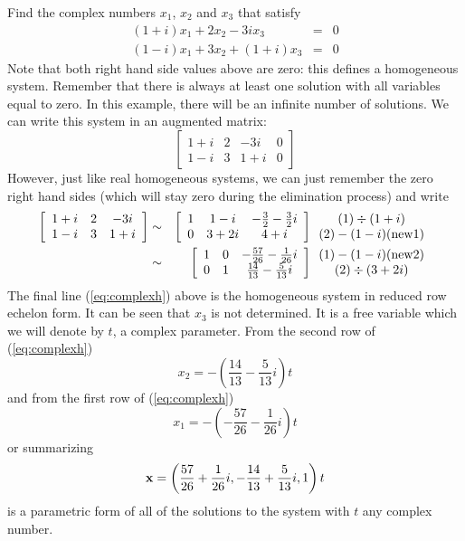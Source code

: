 \begin{example}
Find the complex numbers $x_1$, $x_2$ and $x_3$ that satisfy 
\begin{eqnarray} 
(1+i) x_1 + 2x_2 -3i x_3 & = & 0 \\
(1-i)x_1 +3x_2 + (1+i) x_3 & = & 0 
\end{eqnarray} 
Note that both right hand side values above are zero: this defines a homogeneous system. Remember that there is always at least one solution with all variables equal to zero. In this example, there will be an infinite number of solutions. We can write this system in an augmented matrix:
\[
\left[ \begin{array}{ccc|c} 1+i & 2 & -3i & 0 \\ 1-i & 3 & 1+i & 0 \end{array} \right]
\]
However, just like real homogeneous systems, we can just remember the zero right hand sides (which will stay zero during the elimination process) and write 
\begin{eqnarray}
\nonumber
\left[ \begin{array}{ccc} 1+i & 2 & -3i \\ 1-i & 3 & 1+i \end{array} \right] & \sim & 
\left[ \begin{array}{ccc} 1 & 1-i & -\frac{3}{2} - \frac{3}{2} i  \\ 0 & 3+2i  & 4+i \end{array} \right]
\begin{array}{c} (1) \div (1+i) \\ (2) - (1-i) ({\rm new}1) \end{array} \\
\label{eq:complexh}
& \sim & 
\left[ \begin{array}{ccc} 1 & 0 & -\frac{57}{26} - \frac{1}{26} i  \\ 0 & 1  & \frac{14}{13} - \frac{5}{13} i \end{array} \right]
\begin{array}{c} (1) - (1-i) ({\rm new}2) \\ (2) \div (3+2i) \end{array} 
\end{eqnarray} 
The final line (\ref{eq:complexh}) above is the homogeneous system in reduced row echelon form. It can be seen that $x_3$ is not determined. It is a free variable which we will denote by $t$, a complex parameter. From the second row of (\ref{eq:complexh}) 
\[
x_2 = -(\frac{14}{13} - \frac{5}{13}i) t 
\]
and from the first row of (\ref{eq:complexh}) 
\[
x_1 = -(-\frac{57}{26} - \frac{1}{26}i) t 
\]
or summarizing 
\[
{\bf x} = \left(  \frac{57}{26} + \frac{1}{26}i, -\frac{14}{13} + \frac{5}{13}i, 1\right) t 
\]
is a parametric form of all of the solutions to the system with $t$ any complex number.
\end{example} 

